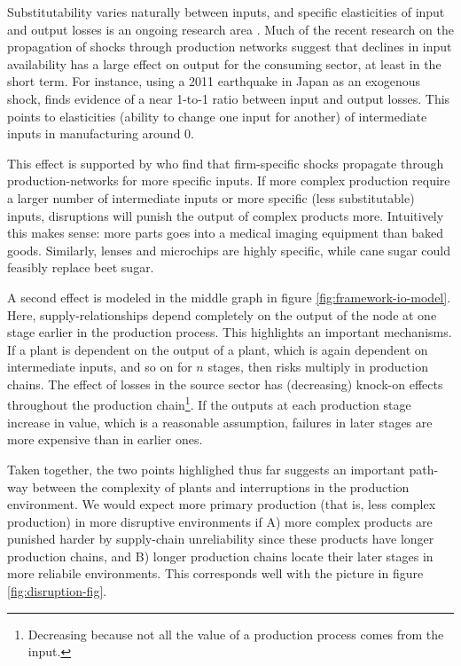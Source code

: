 \documentclass[11pt]{article}
\begin{document}
Substitutability varies naturally between inputs, and specific elasticities of input and output losses is an ongoing research area \citep{brummitt_contagious_2017,carvalho_micro_2014}. Much of the recent research on the propagation of shocks through production networks suggest that declines in input availability has a large effect on output for the consuming sector, at least in the short term. For instance, using a 2011 earthquake in Japan as an exogenous shock, \cite{boehm_input_2019-1} finds evidence of a near 1-to-1 ratio between input and output losses. This points to elasticities (ability to change one input for another) of intermediate inputs in manufacturing around 0.

This effect is supported by \cite{barrot_input_2016} who find that firm-specific shocks propagate through production-networks for more specific inputs. If more complex production require a larger number of intermediate inputs or more specific (less substitutable) inputs, disruptions will punish the output of complex products more. Intuitively this makes sense: more parts goes into a medical imaging equipment than baked goods. Similarly, lenses and microchips are highly specific, while cane sugar could feasibly replace beet sugar.

A second effect is modeled in the middle graph in figure \ref{fig:framework-io-model}. Here, supply-relationships depend completely on the output of the node at one stage earlier in the production process. This highlights an important mechanisms. If a plant is dependent on the output of a plant, which is again dependent on intermediate inputs, and so on for \(n\) stages, then risks multiply in production chains. The effect of losses in the source sector has (decreasing) knock-on effects throughout the production chain\footnote{Decreasing because not all the value of a production process comes from the input.}. If the outputs at each production stage increase in value, which is a reasonable assumption, failures in later stages are more expensive than in earlier ones.

Taken together, the two points highlighed thus far suggests an important path-way between the complexity of plants and interruptions in the production environment.  We would expect more primary production (that is, less complex production) in more disruptive environments if A) more complex products are punished harder by supply-chain unreliability since these products have longer production chains, and B) longer production chains locate their later stages in more reliabile environments. This corresponds well with the picture in figure \ref{fig:disruption-fig}. 
\end{document}
